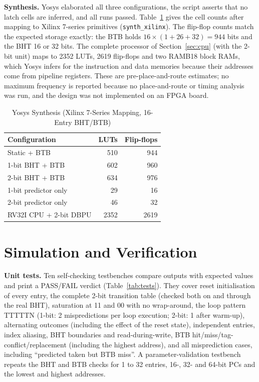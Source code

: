 \documentclass[conference]{IEEEtran}
\newcommand{\sig}[1]{\texttt{\detokenize{#1}}}
\begin{document}
\textbf{Synthesis.} Yosys elaborated all three configurations, the script asserts that no latch
cells are inferred, and all runs passed. Table~\ref{tab:synth} gives the cell counts after
mapping to Xilinx 7-series primitives (\texttt{synth\_xilinx}). The flip-flop counts match the
expected storage exactly: the BTB holds $16\times(1+26+32)=944$ bits and the BHT 16 or 32 bits.
The complete processor of Section~\ref{sec:cpu} (with the 2-bit unit) maps to 2352 LUTs, 2619
flip-flops and two RAMB18 block RAMs, which Yosys infers for the instruction and data memories
because their addresses come from pipeline registers. These are pre-place-and-route estimates; no
maximum frequency is reported because no place-and-route or timing analysis was run, and the
design was not implemented on an FPGA board.

\begin{table}[t]
\caption{Yosys Synthesis (Xilinx 7-Series Mapping, 16-Entry BHT/BTB)}
\label{tab:synth}
\centering
\footnotesize
\begin{tabular}{@{}l r r@{}}
\toprule
Configuration & LUTs & Flip-flops \\
\midrule
Static + BTB & 510 & 944 \\
1-bit BHT + BTB & 602 & 960 \\
2-bit BHT + BTB & 634 & 976 \\
1-bit predictor only & 29 & 16 \\
2-bit predictor only & 46 & 32 \\
RV32I CPU + 2-bit DBPU & 2352 & 2619 \\
\bottomrule
\end{tabular}
\end{table}

\section{Simulation and Verification}
\textbf{Unit tests.} Ten self-checking testbenches compare outputs with expected values and
print a PASS/FAIL verdict (Table~\ref{tab:tests}). They cover reset initialisation of every entry,
the complete 2-bit transition table (checked both on \sig{update_logic} and through the real BHT),
saturation at 11 and 00 with no wrap-around, the loop pattern TTTTTN (1-bit: 2 mispredictions per
loop execution; 2-bit: 1 after warm-up), alternating outcomes (including the effect of the reset state), independent entries, index
aliasing, BHT boundaries and read-during-write, BTB hit/miss/tag-conflict/replacement (including the highest address), and all
misprediction cases, including ``predicted taken but BTB miss''. A parameter-validation testbench repeats the BHT and BTB checks for 1 to 32 entries, 16-, 32- and 64-bit PCs and the lowest and highest addresses.
\end{document}
